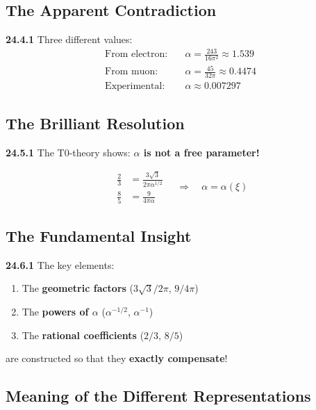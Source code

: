 \documentclass[12pt,a4paper]{article}
\begin{document}
\subsection{The Apparent Contradiction}

\noindent \textbf{24.4.1} Three different values:
\begin{align*}
	\text{From electron:} &\quad \alpha = \frac{243}{16\pi^2} \approx 1.539 \\
	\text{From muon:} &\quad \alpha = \frac{45}{32\pi} \approx 0.4474 \\
	\text{Experimental:} &\quad \alpha \approx 0.007297
\end{align*}

\subsection{The Brilliant Resolution}

\noindent \textbf{24.5.1} The T0-theory shows: \textbf{$\alpha$ is not a free parameter!}

\[
\boxed{
	\begin{aligned}
		\frac{2}{3} &= \frac{3\sqrt{3}}{2\pi\alpha^{1/2}} \\
		\frac{8}{5} &= \frac{9}{4\pi\alpha}
	\end{aligned}
	\quad \Rightarrow \quad
	\alpha = \alpha(\xi)
}
\]

\subsection{The Fundamental Insight}

\noindent \textbf{24.6.1} The key elements:
\begin{enumerate}
	\item The \textbf{geometric factors} ($3\sqrt{3}/2\pi$, $9/4\pi$)
	\item The \textbf{powers of $\alpha$} ($\alpha^{-1/2}$, $\alpha^{-1}$)  
	\item The \textbf{rational coefficients} ($2/3$, $8/5$)
\end{enumerate}

\noindent are constructed so that they \textbf{exactly compensate}!

\subsection{Meaning of the Different Representations}
\end{document}
